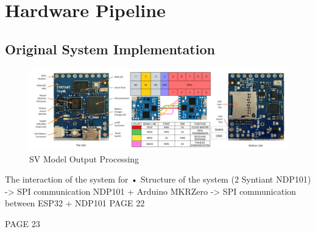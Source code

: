 \section{Hardware Pipeline}
\label{sec:hw pipeline}
\subsection{Original System Implementation}
\begin{center}
    \centering
    \begin{figure}[!h]
        \includegraphics[width=1.0\textwidth]{images/4.05 Hardware Pipeline 2 NDP101.png}
        \caption{SV Model Output Processing}
    \end{figure}
\end{center}
The interaction of the system for 
• Structure of the system (2 Syntiant NDP101)\newline
-> SPI communication NDP101 + Arduino MKRZero\newline
-> SPI communication between ESP32 + NDP101\newline\newline
PAGE 22
\newpage

PAGE 23
\newpage


